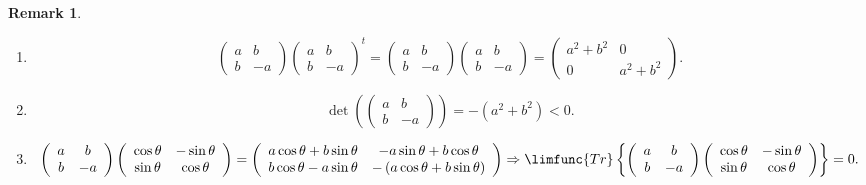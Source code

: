\documentclass[aps,preprint]{revtex4}
\newtheorem{remark}[theorem]{Remark}
\begin{document}
\begin{remark}
\begin{enumerate}
\item 
\begin{equation}
\left( 
\begin{array}{cc}
a & b \\ 
b & -a%
\end{array}%
\right) \left( 
\begin{array}{cc}
a & b \\ 
b & -a%
\end{array}%
\right) ^{t}=\left( 
\begin{array}{cc}
a & b \\ 
b & -a%
\end{array}%
\right) \left( 
\begin{array}{cc}
a & b \\ 
b & -a%
\end{array}%
\right) =\left( 
\begin{array}{cc}
a^{2}+b^{2} & 0 \\ 
0 & a^{2}+b^{2}%
\end{array}%
\right) .
\end{equation}

\item 
\begin{equation}
\det \left( \left( 
\begin{array}{cc}
a & b \\ 
b & -a%
\end{array}%
\right) \right) =-\left( a^{2}+b^{2}\right) <0.
\end{equation}

\item 
\begin{equation}
\left( 
\begin{array}{cc}
a & b \\ 
b & -a%
\end{array}%
\right) \left( 
\begin{array}{cc}
\cos \theta & -\sin \theta \\ 
\sin \theta & \cos \theta%
\end{array}%
\right) =\left( 
\begin{array}{cc}
a\cos \theta +b\sin \theta & -a\sin \theta +b\cos \theta \\ 
b\cos \theta -a\sin \theta & -\left( a\cos \theta +b\sin \theta \right)%
\end{array}%
\right) \Rightarrow \limfunc{Tr}\left\{ \left( 
\begin{array}{cc}
a & b \\ 
b & -a%
\end{array}%
\right) \left( 
\begin{array}{cc}
\cos \theta & -\sin \theta \\ 
\sin \theta & \cos \theta%
\end{array}%
\right) \right\} =0.
\end{equation}
\end{enumerate}
\end{remark}
\end{document}
